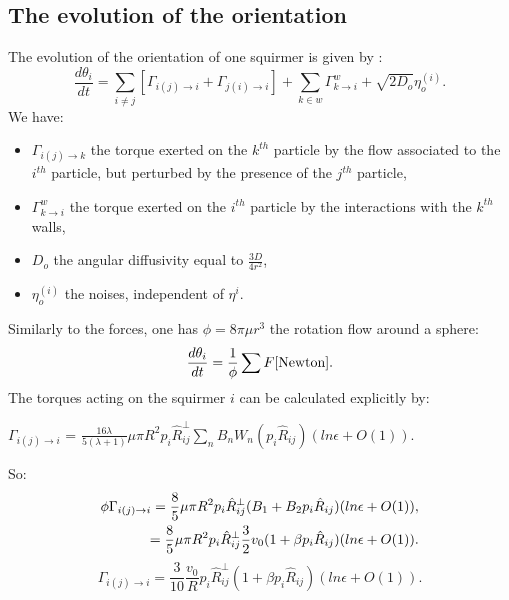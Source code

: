 \documentclass{article}
\begin{document}
\subsection{The evolution of the orientation}
The evolution of the orientation of one squirmer is given by : 
$$
\boxed{\frac{d \theta_i}{dt} = \sum\limits_{i\ne j} \left[\Gamma_{i(j)\rightarrow i} + \Gamma_{j(i)\rightarrow i}\right] + \sum\limits_{k\in w} \Gamma_{k\rightarrow i}^w + \sqrt{2D_o} \eta_o^{(i)}}.
$$
We have:
\begin{itemize}
    \item $\Gamma_{i(j)\rightarrow k}$ the torque exerted on the $k^{th}$ particle by the flow associated to the $i^{th}$ particle, but perturbed by the presence of the $j^{th}$ particle,
    \item $\Gamma_{k\rightarrow i}^w$ the torque exerted on the $i^{th}$ particle by the interactions with the $k^{th}$ walls,
    \item $D_o$ the angular diffusivity equal to $\frac{3D}{4r^2}$,
    \item $\eta_o^{(i)}$ the noises, independent of $\eta^{i}$.
\end{itemize}
\vspace{0.5cm}
Similarly to the forces, one has $\phi = 8\pi\mu r^3$ the rotation flow around a sphere\cite{Stokes}:
$$\frac{d \theta_i}{dt} = \frac{1}{\phi}\sum F\cite{Newton}.$$
The torques acting on the squirmer $i$ can be calculated explicitly by\cite{Brumley}:
\begin{center}
    $\Gamma_{i(j)\rightarrow i}$ = $\frac{16 \lambda}{5(\lambda +1)} \mu \pi R^2 p_i\hat{R}_{ij}^{\perp}\sum_{n} B_n W_n(p_i\hat{R}_{ij}) (ln \epsilon + O(1))$.   
\end{center}
So:
\begin{align*}
    \footnotesize
    \phi \Gamma_{i(j)\rightarrow i} = \frac{8}{5}\mu\pi R^2p_i\hat{R}_{ij}^{\perp}(B_1 + B_2 p_i\hat{R}_{ij})(ln \epsilon + O(1)),\\
    = \frac{8}{5}\mu\pi R^2p_i\hat{R}_{ij}^{\perp}\frac{3}{2}v_0(1 + \beta p_i\hat{R}_{ij})(ln \epsilon + O(1)).
\end{align*}
\begin{equation*}
    \boxed{\Gamma_{i(j)\rightarrow i} = \frac{3}{10}\frac{v_0}{R}p_i\hat{R}_{ij}^{\perp}(1 + \beta p_i\hat{R}_{ij})(ln \epsilon + O(1))}.
\end{equation*}
\end{document}

